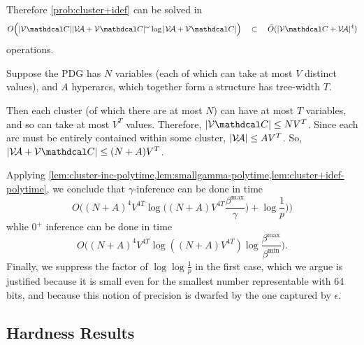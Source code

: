 \begin{lproof}
    Therefore \eqref{prob:cluster+idef} can be solved in 
    \begin{align*}
        O\Big( |\V \C| |\V \!\Ar + \V \C|^{\omega} 
            \log |\V \!\Ar + \V \C| \Big) 
        \quad\subset\quad
        \tilde O( |\V \C + \V \! \Ar|^{4} )
    \end{align*}
    operations.
\end{lproof}

\begin{lproof}\label{proof:main}
    Suppose the PDG has $N$ variables 
    (each of which can take at most $V$ distinct values), 
    and $A$ hyperarcs, which together form a structure has tree-width $T$. 
    
    Then each cluster (of which there are at most $N$) 
    can have at most $T$ variables, and so can take at most $V^T$ values.
    Therefore, $|\V \C| \le N V^T$.
    Since each arc must be entirely contained within some cluster, 
    $|\mathcal V\!\mathcal A| \le A V^T$. 
    So, $|\V\!\Ar + \V \C| \le (N+A) V^T$. 
    
    Applying \cref{lem:cluster-inc-polytime,lem:smallgamma-polytime,lem:cluster+idef-polytime}, we conclude that $\gamma$-inference can be done in time
    \[
        O\Big(  (N+A)^4 V^{4T} \log \Big((N+A) V^{4T} \frac{\beta^{\max}}{\gamma}) + \log \frac{1}{p} \Big)  \Big)
    \]
    whlie $0^+$ inference can be done in time
    \[
        O\Big(  (N+A)^4 V^{4T} \log ((N+A) V^{4T}) \log \frac{\beta^{\max}}{\beta^{\min}} \Big).
    \]
    Finally, we suppress the factor of $\log \log \frac1p$ in the first case, which we argue is justified because it is small even for the smallest number representable with 64 bits, and because this notion of precision is dwarfed by the one captured by $\epsilon$. 
\end{lproof}

\subsection{Hardness Results}

